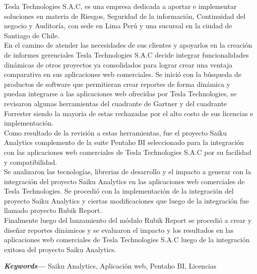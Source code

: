 \makeatletter
\newenvironment{abstract}{%
	\titlepage
	\null\vfil
	\@beginparpenalty\@lowpenalty
	\begin{center}%
		\large\bfseries\abstractname
		\@endparpenalty\@M
	\end{center}
}%
{\par\vfil\null
	\endtitlepage}
\makeatother

\providecommand{\keywords}[1]
{
	\small	
	\textbf{\textit{Keywords---}} #1
}

\begin{titlepage}
	 \begin{abstract}
		\begin{spacing}{1.5}
		Tesla Technologies S.A.C, es una empresa dedicada a aportar e implementar soluciones en materia de Riesgos, Seguridad de la información, Continuidad del negocio y Auditoría, con sede en Lima Perú y una sucursal en la ciudad de Santiago de Chile.\\	
		En el camino de atender las necesidades de sus clientes y apoyarlos en la creación de informes gerenciales Tesla Technologies S.A.C decide integrar funcionalidades dinámicas de otros proyectos ya consolidados para lograr crear una ventaja comparativa en sus aplicaciones web comerciales.
		Se inició con la búsqueda de productos de software que permitieran crear reportes de forma dinámica y puedan integrarse a las aplicaciones web ofrecidas por Tesla Technologies, se revisaron algunas herramientas del cuadrante de Gartner y del cuadrante Forrester siendo la mayoria de estas rechazadas por el alto costo de sus licencias e implementación.\\
		Como resultado de la revisión a estas herramientas, fue el proyecto Saiku Analytics complemento de la suite Pentaho BI seleccionado para la integración con las aplicaciones web comerciales de Tesla Technologies S.A.C por su facilidad y compatibilidad.\\
		Se analizaron las tecnologías, librerias de desarrollo y el impacto a generar  con la integración del proyecto Saiku Analytics en las aplicaciones web comerciales de Tesla Technologies.
		Se procedió con la implementación de la integración del proyecto Saiku Analytics y ciertas modificaciones que luego de la integración fue llamado proyecto Rubik Report.\\
		Finalmente luego del lanzamiento del módulo Rubik Report se procedió a crear y diseñar reportes dinámicos y se evaluaron el impacto y los resultados en las aplicaciones web comerciales de Tesla Technologies S.A.C luego de la integración exitosa del proyecto Saiku Analytics.\\		
		\end{spacing}
	\keywords{Saiku Analytics, Aplicación web, Pentaho BI, Licencias}
	\end{abstract}
\end{titlepage}
